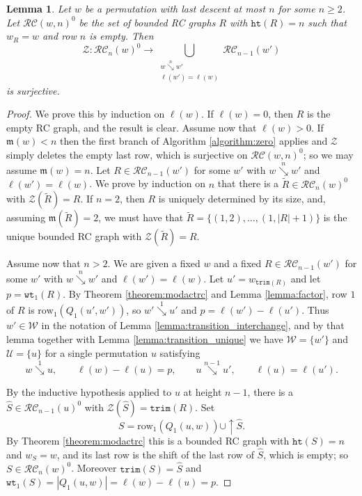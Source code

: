 \documentclass{amsart}
\newtheorem{lemma}{Lemma}[subsection]
\theoremstyle{definition}
\theoremstyle{remark}
\numberwithin{equation}{subsection}
\newcommand{\shup}{{\uparrow}}
\newcommand{\downvar}[1]{\stackrel{#1}{\searrow}}
\newcommand{\wof}[1]{w_{#1}}
\newcommand{\wtt}{\mathtt{wt}}
\newcommand{\trm}{\mathtt{trim}}
\newcommand{\zeromap}{\mathcal{Z}}
\newcommand{\hr}{\mathtt{ht}}
\newcommand{\RC}{\mathcal{RC}}
\newcommand{\maxd}{\mathfrak{m}}
\begin{document}
\begin{lemma} \label{lemma:zero_surjective}
Let $w$ be a permutation with last descent at most $n$ for some $n\geq 2$. Let $\mathcal{RC}(w,n)^0$ be the set of bounded RC graphs $R$ with $\hr(R) = n$ such that $\wof{R}=w$ and row $n$ is empty. Then
$$\zeromap:\RC_n(w)^{0}\to \bigcup_{\substack{w\downvar{n}w'\\\ell(w')=\ell(w)}}\RC_{n-1}(w')$$
is surjective.
\end{lemma}
\begin{proof}

  We prove this by induction on $\ell(w)$. If $\ell(w)=0$, then $R$ is the empty RC graph, and the result is clear. Assume now that $\ell(w)>0$. If $\maxd(w)<n$ then the first branch of Algorithm \ref{algorithm:zero} applies and $\zeromap$ simply deletes the empty last row, which is surjective on $\mathcal{RC}(w,n)^0$; so we may assume $\maxd(w)=n$. Let $R\in \RC_{n-1}(w')$ for some $w'$ with $w\downvar{n} w'$ and $\ell(w')=\ell(w)$. We prove by induction on $n$ that there is a $\widetilde{R}\in \RC_n(w)^0$ with $\zeromap(\widetilde{R})=R$. If $n=2$, then $R$ is uniquely determined by its size, and, assuming $\maxd(\widetilde{R})=2$, we must have that $\widetilde{R} = \{(1,2),\ldots,(1,|R|+1)\}$ is the unique bounded RC graph with $\zeromap(\widetilde{R})=R$. 
  
  Assume now that $n>2$. We are given a fixed $w$ and a fixed $R\in \RC_{n-1}(w')$ for some $w'$ with $w\downvar{n} w'$ and $\ell(w')=\ell(w)$. Let $u'=\wof{\trm(R)}$ and let $p=\wtt_1(R)$. By Theorem \ref{theorem:modactrc} and Lemma \ref{lemma:factor}, row $1$ of $R$ is $\mathrm{row}_1(Q_1(u',w'))$, so $w'\downvar{1}u'$ and $p=\ell(w')-\ell(u')$. Thus $w'\in\mathcal{W}$ in the notation of Lemma \ref{lemma:transition_interchange}, and by that lemma together with Lemma \ref{lemma:transition_unique} we have $\mathcal{W}=\{w'\}$ and $\mathcal{U}=\{u\}$ for a single permutation $u$ satisfying
  $$w\downvar{1}u,\qquad \ell(w)-\ell(u)=p,\qquad u\downvar{n-1}u',\qquad \ell(u)=\ell(u').$$

  By the inductive hypothesis applied to $u$ at height $n-1$, there is a $\widehat{S}\in \RC_{n-1}(u)^0$ with $\zeromap(\widehat{S}) = \trm(R)$. Set
  $$S=\mathrm{row}_1(Q_1(u,w))\cup\shup\widehat{S}.$$
  By Theorem \ref{theorem:modactrc} this is a bounded RC graph with $\hr(S)=n$ and $\wof S=w$, and its last row is the shift of the last row of $\widehat S$, which is empty; so $S\in\RC_n(w)^0$. Moreover $\trm(S)=\widehat S$ and $\wtt_1(S)=|Q_1(u,w)|=\ell(w)-\ell(u)=p$.


\end{proof}
\end{document}
